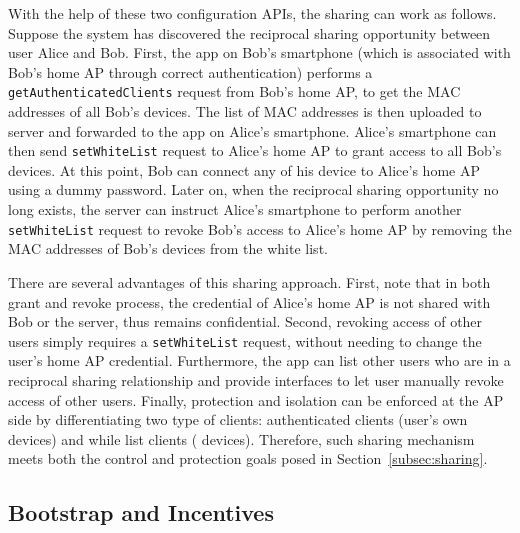 With the help of these two configuration APIs, the \wifi{} sharing can work as
follows. Suppose the system has discovered the reciprocal sharing opportunity
between user Alice and Bob. First, the \wisefi{} app on Bob's smartphone (which
is associated with Bob's home AP through correct authentication) performs a
\texttt{getAuthenticatedClients} request from Bob's home AP, to get the MAC
addresses of all Bob's devices. The list of MAC addresses is then uploaded to
\wisefi{} server and forwarded to the \wisefi{} app on Alice's smartphone.
Alice's smartphone can then send \texttt{setWhiteList} request to Alice's home
AP to grant access to all Bob's devices. At this point, Bob can connect any of
his device to Alice's home AP using a dummy password. Later on, when the
reciprocal sharing opportunity no long exists, the \wisefi{} server can instruct
Alice's smartphone to perform another \texttt{setWhiteList} request to revoke
Bob's access to Alice's home AP by removing the MAC addresses of Bob's devices
from the white list.

There are several advantages of this sharing approach. First, note that in both
grant and revoke process, the \wifi{} credential of Alice's home AP is not
shared with Bob or the \wisefi{} server, thus remains confidential. Second,
revoking access of other \wisefi{} users simply requires a \texttt{setWhiteList}
request, without needing to change the user's home AP \wifi{} credential.
Furthermore, the \wisefi{} app can list other \wiseif{} users who are in a
reciprocal sharing relationship and provide interfaces to let user manually
revoke access of other users. Finally, protection and isolation can be enforced
at the AP side by differentiating two type of clients: authenticated clients
(user's own devices) and while list clients (\wisefi{} devices). Therefore, such
sharing mechanism meets both the control and protection goals posed in
Section~\ref{subsec:sharing}.

\subsection{Bootstrap and Incentives}

